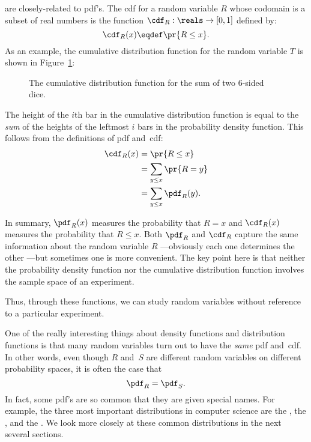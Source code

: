  are closely-related
to pdf's.  The cdf for a random variable $R$ whose codomain is a
subset of real numbers is the function $\cdf_R : \reals \to [0,1]$
defined by:
%
\[
\cdf_R(x) \eqdef \pr{R \leq x}.
\]
%
As an example, the cumulative distribution function for the random
variable $T$ is shown in Figure~\ref{fig:16F3}:
%
\begin{figure}


\caption{The cumulative distribution function for the sum of two
  6-sided dice.}

\label{fig:16F3}

\end{figure}
%
The height of the $i$th bar in the cumulative distribution function
is equal to the \emph{sum} of the heights of the leftmost $i$ bars
in the probability density function.  This follows from the
definitions of pdf and~cdf:
%
\begin{align*}
\cdf_R(x) & = \pr{R \leq x} \\
          & = \sum_{y \leq x} \pr{R = y} \\
          & = \sum_{y \leq x} \pdf_R(y).
\end{align*}

In summary, $\pdf_R(x)$ measures the probability that $R = x$ and
$\cdf_R(x)$ measures the probability that $R \leq x$.  Both $\pdf_R$
and $\cdf_R$ capture the same information about the random variable
$R$ ---obviously each one determines the other ---but sometimes one is
more convenient.  The key point here is that neither the probability
density function nor the cumulative distribution function involves the
sample space of an experiment.

\begin{editingnotes}
Thus, through these
functions, we can study random variables without reference to a
particular experiment.

\end{editingnotes}

One of the really interesting things about density functions and
distribution functions is that many random variables turn out to have
the \emph{same} pdf and~cdf.  In other words, even though $R$ and~$S$
are different random variables on different probability spaces, it is
often the case that
\begin{equation*}
    \pdf_R = \pdf_S.
\end{equation*}
In fact, some pdf's are so common that they are given special names.
For example, the three most important distributions in computer
science are the , the , and the .  We look more
closely at these common distributions in the next several sections.

